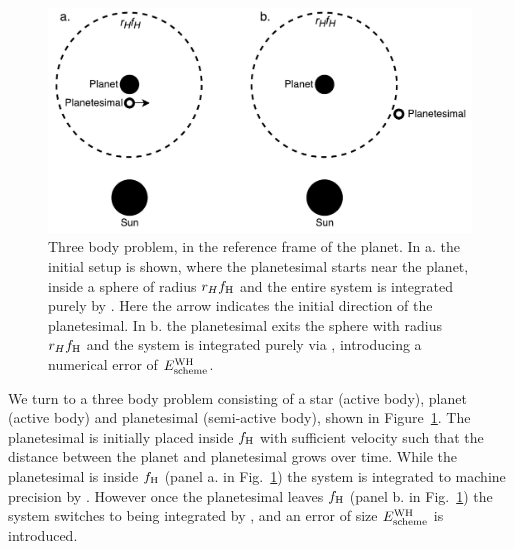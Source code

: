 \begin{figure}
\centerline{\includegraphics[scale=0.45]{chap4/images/R3B.pdf}}
\caption{Three body problem, in the reference frame of the planet. 
In a. the initial setup is shown, where the planetesimal starts near the planet, inside a sphere of radius $r_Hf_{\rm H}$ and the entire system is integrated purely by \ias. 
Here the arrow indicates the initial direction of the planetesimal. 
In b. the planetesimal exits the sphere with radius $r_Hf_{\rm H}$ and the system is integrated purely via \whfast, introducing a numerical error of $E_{\rm scheme}^{\rm WH}$.
}
\label{fig:R3B}
\end{figure}

We turn to a three body problem consisting of a star (active body), planet (active body) and planetesimal (semi-active body), shown in Figure~\ref{fig:R3B}.
The planetesimal is initially placed inside $f_{\rm H}$ with sufficient velocity such that the distance between the planet and planetesimal grows over time. 
While the planetesimal is inside $f_{\rm H}$ (panel a. in Fig.~\ref{fig:R3B}) the system is integrated to machine precision by \ias.
However once the planetesimal leaves $f_{\rm H}$ (panel b. in Fig.~\ref{fig:R3B}) the system switches to being integrated by \whfast, and an error of size $E_{\rm scheme}^{\rm WH}$ is introduced.

